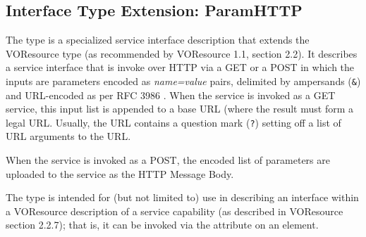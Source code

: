 \documentclass[11pt,a4paper]{ivoa}
\begin{document}
\subsection{Interface Type Extension: ParamHTTP}
\label{sect:paramif}


The  type is a specialized service interface
description that extends the VOResource  type 
(as recommended by VOResource 1.1, section 2.2).  It
describes a service interface that is invoke over HTTP via a GET or a
POST in which the inputs are parameters
encoded as \emph{name=value} pairs, delimited by ampersands
(\verb|&|) and URL-encoded as per RFC 3986 \citep{std:RFC3986}.  When
the service is invoked as a GET service, this input list is appended
to a base URL (where the result must form a legal URL.  Usually, the
URL contains a question mark (\verb|?|) setting off a list of
URL arguments to the URL.


When the service is invoked as a POST, the encoded list of parameters
are uploaded to the service as the HTTP Message Body.  


The  type is intended for (but not limited
to) use in describing an interface within a VOResource description of
a service capability (as described in VOResource
section 2.2.7); that is, it can be invoked via the
 attribute on an 
element. 
\end{document}
